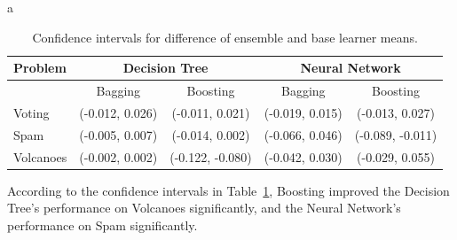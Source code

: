 \documentclass[fleqn]{homework}
\begin{document}
\begin{problem}{a}
    \begin{table}[h]
      \centering
      \caption{Confidence intervals for difference of ensemble and base learner means.}
      \label{t:a-ci}
      \begin{tabular}{lcccc}
        \toprule
        Problem   & \multicolumn{2}{c}{Decision Tree} & \multicolumn{2}{c}{Neural Network} \\
        \midrule
                  & Bagging         & Boosting        & Bagging         & Boosting \\
        Voting    & (-0.012, 0.026) & (-0.011, 0.021) & (-0.019, 0.015) & (-0.013, 0.027)\\
        Spam      & (-0.005, 0.007) & (-0.014, 0.002) & (-0.066, 0.046) & (-0.089, -0.011)\\
        Volcanoes & (-0.002, 0.002) & (-0.122, -0.080)& (-0.042, 0.030) & (-0.029, 0.055)\\
        \bottomrule
      \end{tabular}
    \end{table}

    According to the confidence intervals in Table~\ref{t:a-ci}, Boosting
    improved the Decision Tree's performance on Volcanoes significantly, and the
    Neural Network's performance on Spam significantly.
  \end{problem}
\end{document}
